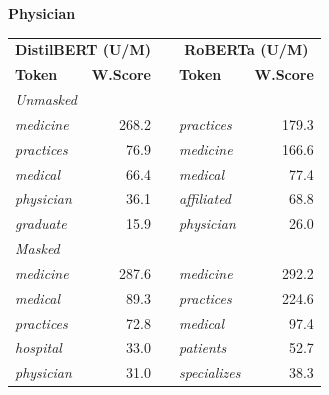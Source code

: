 \documentclass[11pt]{article}
\begin{document}
\vspace{4pt}\noindent\textbf{Physician}
\begin{center}\scriptsize
\begin{tabular}{lrllr}
\toprule
\multicolumn{2}{c}{\textbf{DistilBERT (U/M)}} & & \multicolumn{2}{c}{\textbf{RoBERTa (U/M)}} \\
\textbf{Token} & \textbf{W.Score} & & \textbf{Token} & \textbf{W.Score} \\
\midrule
\multicolumn{5}{l}{\textit{Unmasked}} \\
\emph{medicine} & 268.2 & & \emph{practices} & 179.3 \\
\emph{practices} & 76.9 & & \emph{medicine} & 166.6 \\
\emph{medical} & 66.4 & & \emph{medical} & 77.4 \\
\emph{physician} & 36.1 & & \emph{affiliated} & 68.8 \\
\emph{graduate} & 15.9 & & \emph{physician} & 26.0 \\
\multicolumn{5}{l}{\textit{Masked}} \\
\emph{medicine} & 287.6 & & \emph{medicine} & 292.2 \\
\emph{medical} & 89.3 & & \emph{practices} & 224.6 \\
\emph{practices} & 72.8 & & \emph{medical} & 97.4 \\
\emph{hospital} & 33.0 & & \emph{patients} & 52.7 \\
\emph{physician} & 31.0 & & \emph{specializes} & 38.3 \\
\bottomrule
\end{tabular}
\end{center}
\end{document}
